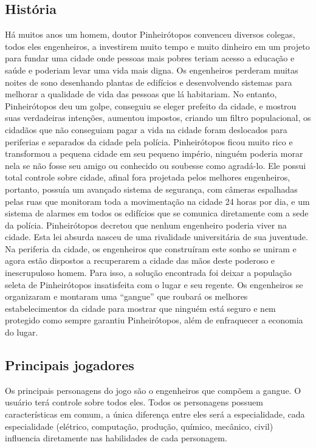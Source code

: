 \subsection{História}
Há muitos anos um homem, doutor Pinheirótopos convenceu diversos colegas, todos eles engenheiros, a investirem muito tempo e muito dinheiro em um projeto para fundar uma cidade onde pessoas mais pobres teriam acesso a educação e saúde e poderiam levar uma vida mais digna. Os engenheiros perderam muitas noites de sono desenhando plantas de edifícios e desenvolvendo sistemas para melhorar a qualidade de vida das pessoas que lá habitariam. 
No entanto, Pinheirótopos deu um golpe, conseguiu se eleger prefeito da cidade, e mostrou suas verdadeiras intenções, aumentou impostos, criando um filtro populacional, os cidadãos que não conseguiam pagar a vida na cidade foram deslocados para periferias e separados da cidade pela polícia.
Pinheirótopos ficou muito rico e transformou a pequena cidade em seu pequeno império, ninguém poderia morar nela se não fosse seu amigo ou conhecido ou soubesse como agradá-lo. Ele possui total controle sobre cidade, afinal fora projetada pelos melhores engenheiros, portanto, possuía um avançado sistema de segurança, com câmeras espalhadas pelas ruas que monitoram toda a movimentação na cidade 24 horas por dia, e um sistema de alarmes em todos os edifícios que se comunica diretamente com a sede da polícia.
Pinheirótopos decretou que nenhum engenheiro poderia viver na cidade. Esta lei absurda nasceu de uma rivalidade universitária de sua juventude.
Na periferia da cidade, os engenheiros que construíram este sonho se uniram e agora estão dispostos a recuperarem a cidade das mãos deste poderoso e inescrupuloso homem. Para isso, a solução encontrada foi deixar a população seleta de Pinheirótopos insatisfeita com o lugar e seu regente. Os engenheiros se organizaram e montaram uma “gangue” que roubará os melhores estabelecimentos da cidade para mostrar que ninguém está seguro e nem protegido como sempre garantiu Pinheirótopos, além de enfraquecer a economia do lugar.


\subsection{Principais jogadores}
Os principais personagens do jogo são o engenheiros que compõem a gangue. O usuário terá controle sobre todos eles.
Todos os personagens possuem características em comum, a única diferença entre eles será a especialidade, cada especialidade (elétrico, computação, produção, químico, mecânico, civil) influencia diretamente nas habilidades de cada personagem.

